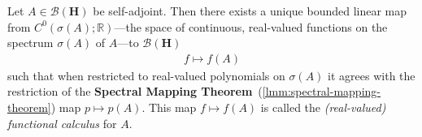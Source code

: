 \begin{proposition}
    \label{prpstn:hall-8.3}
    \leanok
    Let $A \in \mathcal{B}(\mathbf{H})$ be self-adjoint. Then there exists a unique bounded linear map from $C^0(\sigma(A); \mathbb{R})$---the space of continuous, real-valued functions on the spectrum $\sigma(A)$ of $A$---to $\mathcal{B}(\mathbf{H})$
    \begin{align}
        f \longmapsto f(A)
    \end{align}
    such that when restricted to real-valued polynomials on $\sigma(A)$ it agrees with the restriction of the \textbf{Spectral Mapping Theorem}~(\ref{lmm:spectral-mapping-theorem}) map $p \mapsto p(A)$. This map $f \mapsto f(A)$ is called the \textit{(real-valued) functional calculus} for $A$.
\end{proposition}
